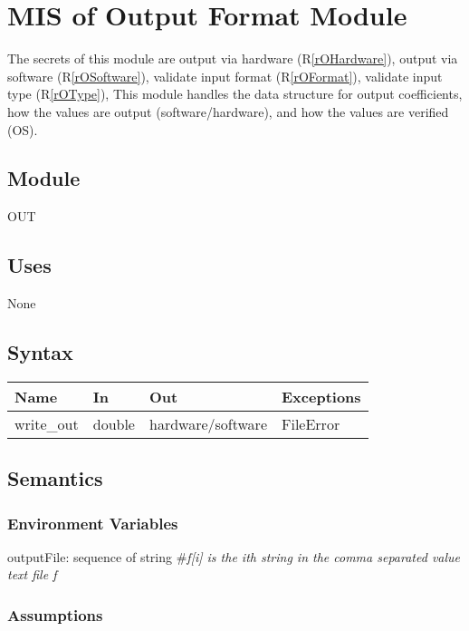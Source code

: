 \documentclass[12pt, titlepage]{article}
\newcommand{\rref}[1]{(R\ref{#1})}
\begin{document}
\section{MIS of Output Format Module} \label{sc:MIS_OUT}

The secrets of this module are
 output via hardware \rref{rOHardware},
 output via software \rref{rOSoftware},
 validate input format \rref{rOFormat},
 validate input type \rref{rOType},
This module handles the data structure for output coefficients,
 how the values are output (software/hardware),
 and how the values are verified (OS).

\subsection{Module}

OUT

\subsection{Uses}

None

\subsection{Syntax}

\begin{tabular}{p{3cm} p{2cm} p{4cm} >{\raggedright\arraybackslash}p{9cm}}
\toprule
\textbf{Name} & \textbf{In} & \textbf{Out} & \textbf{Exceptions} \\
\midrule
write\_out & double & hardware/software &  FileError \\
\bottomrule
\end{tabular}

\subsection{Semantics}

\subsubsection{Environment Variables}

outputFile: sequence of string \#\textit{f[i] is the ith string in the comma separated value text file f}\\ 

\subsubsection{Assumptions}
\end{document}
